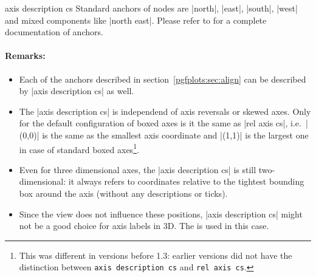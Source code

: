 \begin{coordinatesystem}{axis description cs}
	Standard anchors of nodes are |north|, |east|, |south|, |west| and mixed components like |north east|.
	Please refer to \cite{tikz} for a complete documentation of anchors.

\paragraph{Remarks:} 
\begin{itemize}
	\item Each of the anchors described in section~\ref{pgfplots:sec:align} can be described by |axis description cs| as well.
	\item The |axis description cs| is independend of axis reversals or skewed axes.
	Only for the default configuration of boxed axes is it the same as |rel axis cs|, i.e.\ |(0,0)| is the same as the smallest axis coordinate and |(1,1)| is the largest one in case of standard boxed axes\footnote{This was different in versions before 1.3: earlier versions did not have the distinction between \texttt{axis description cs} and \texttt{rel axis cs}.}.

	\item Even for three dimensional axes, the |axis description cs| is still two-dimensional: it always refers to coordinates relative to the tightest bounding box around the axis (without any descriptions or ticks).
\begin{codeexample}[width=4cm]
\end{codeexample}
	
	\item Since the view does not influence these positions, |axis description cs| might not be a good choice for axis labels in 3D. The  is used in this case.
\end{itemize}
\end{coordinatesystem}

